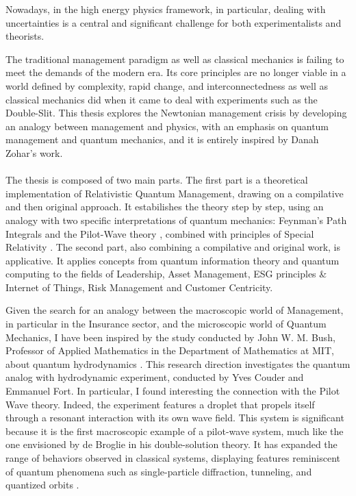 \documentclass{article}
\begin{document}
Nowadays, in the high energy physics framework, in particular, dealing with uncertainties is a central and significant challenge for both experimentalists and theorists. 

The traditional management paradigm as well as classical mechanics is failing to meet the demands of the modern era. Its core principles are no longer viable in a world defined by complexity, rapid change, and interconnectedness as well as classical mechanics did when it came to deal with experiments such as the Double-Slit. This thesis explores the Newtonian management crisis by developing an analogy between management and physics, with an emphasis on quantum management and quantum mechanics, and it is entirely inspired by Danah Zohar's work.\\\\
The thesis is composed of two main parts. The first part is a theoretical implementation of Relativistic Quantum Management, drawing on a compilative and then original approach. It estabilishes the theory step by step, using an analogy with two specific interpretations of quantum mechanics: Feynman's Path Integrals \cite{feynman1963theory} and the Pilot-Wave theory \cite{bohm1952suggested1}, \cite{debroglie1927nouvelle} combined with principles of Special Relativity \cite{einstein1905elektrodynamik}. The second part, also combining a compilative and original work, is applicative. It applies concepts from quantum information theory and quantum computing to the fields of Leadership, Asset Management, ESG principles \& Internet of Things, Risk Management and Customer Centricity.

Given the search for an analogy between the macroscopic world of Management, in particular in the Insurance sector, and the microscopic world of Quantum Mechanics, I have been inspired by the study conducted by John W. M. Bush, Professor of Applied Mathematics in the Department of Mathematics at MIT, about quantum hydrodynamics \cite{dagan2020hydrodynamic}. This research direction investigates the quantum analog with hydrodynamic experiment, conducted by Yves Couder and Emmanuel Fort. In particular, I found interesting the connection with the Pilot Wave theory. Indeed, the experiment features a droplet that propels itself through a resonant interaction with its own wave field. This system is significant because it is the first macroscopic example of a pilot-wave system, much like the one envisioned by de Broglie in his double-solution theory. It has expanded the range of behaviors observed in classical systems, displaying features reminiscent of quantum phenomena such as single-particle diffraction, tunneling, and quantized orbits \cite{dagan2020hydrodynamic}.
\end{document}
